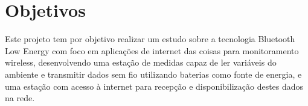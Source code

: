 \section{Objetivos}

Este projeto tem por objetivo realizar um estudo sobre a tecnologia Bluetooth Low Energy com foco em aplicações de internet das coisas para monitoramento wireless, desenvolvendo uma estação de medidas capaz de ler variáveis do ambiente e transmitir dados sem fio utilizando baterias como fonte de energia, e uma estação com acesso à internet para recepção e disponibilização destes dados na rede.